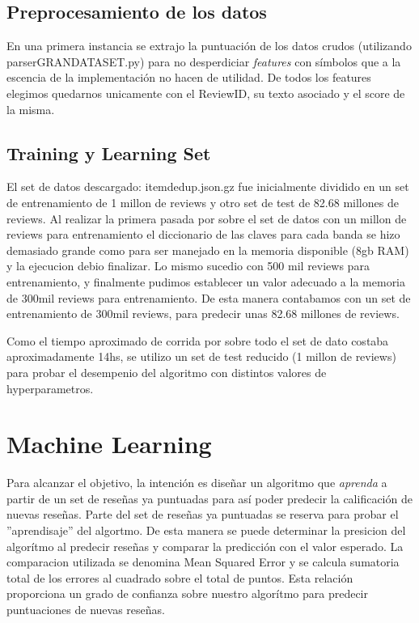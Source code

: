 \documentclass[a4paper,10pt]{article}
\begin{document}
	\subsection{Preprocesamiento de los datos}	

	En una primera instancia se extrajo la puntuaci\'{o}n de los datos crudos (utilizando parserGRANDATASET.py) para no desperdiciar \textit{features} con s\'{i}mbolos que a la escencia de la implementaci\'{o}n no hacen de utilidad. De todos los features elegimos quedarnos unicamente con el ReviewID, su texto asociado y el score de la misma. 
	
	
	\subsection{Training y Learning Set}
	
	El set de datos descargado: itemdedup.json.gz fue inicialmente dividido en un set de entrenamiento de 1 millon de reviews y otro set de test de 82.68 millones de reviews. Al realizar la primera pasada por sobre el set de datos con un millon de reviews para entrenamiento el diccionario de las claves para cada banda se hizo demasiado grande como para ser manejado en la memoria disponible (8gb RAM) y la ejecucion debio finalizar. Lo mismo sucedio con 500 mil reviews para entrenamiento, y finalmente pudimos establecer un valor adecuado a la memoria de 300mil reviews para entrenamiento. De esta manera contabamos con un set de entrenamiento de 300mil reviews, para predecir unas 82.68 millones de reviews.
	
	Como el tiempo aproximado de corrida por sobre todo el set de dato costaba aproximadamente 14hs, se utilizo un set de test reducido (1 millon de reviews) para probar el desempenio del algoritmo con distintos valores de hyperparametros.
	
	\section{Machine Learning}
	
	Para alcanzar el objetivo, la intenci\'{o}n es dise\~{n}ar un algoritmo que \textit{aprenda} a partir de un set de rese\~{n}as ya puntuadas para as\'{i} poder predecir la calificaci\'{o}n de nuevas rese\~{n}as. Parte del set de rese\~{n}as ya puntuadas se reserva para probar el ''aprendisaje'' del algortmo. De esta manera se puede determinar la presicion del algor\'{i}tmo al predecir rese\~{n}as y comparar la predicci\'{o}n con el valor esperado. La comparacion utilizada se denomina Mean Squared Error y se calcula sumatoria total de los errores al cuadrado sobre el total de puntos. Esta relaci\'{o}n proporciona un grado de confianza sobre nuestro algor\'{i}tmo para predecir puntuaciones de nuevas rese\~{n}as.
\end{document}

